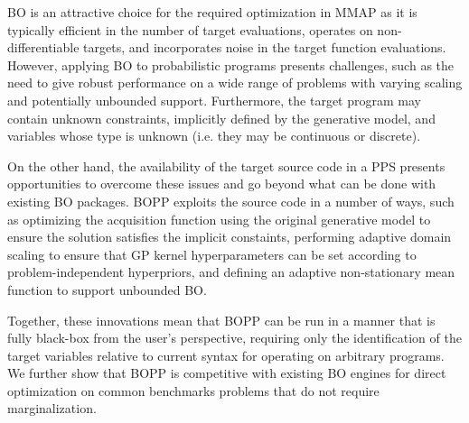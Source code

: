 BO is an attractive choice for the required optimization in MMAP as it is typically efficient in the number of target evaluations, operates on non-differentiable targets, and incorporates noise in the target function evaluations.  However, applying BO to probabilistic programs presents challenges, such as the need to give robust performance on a wide range of problems with varying scaling and potentially unbounded support.  Furthermore, the target program may contain unknown constraints, implicitly defined by the generative model, and variables whose type is unknown (i.e. they may be continuous or discrete).

On the other hand, the availability of the target source code in a PPS presents opportunities to overcome these issues and go beyond what can be done with existing BO packages.  BOPP exploits the source code in a number of ways, such as optimizing the acquisition function using the original generative model to ensure the solution satisfies the implicit constaints, performing adaptive domain scaling to ensure that GP kernel hyperparameters can be set according to problem-independent hyperpriors, and defining an adaptive non-stationary mean function to support unbounded BO. 

Together, these innovations mean that BOPP can be run in a manner that is fully black-box from the user's perspective, requiring only the identification of the target variables relative to current syntax for operating on arbitrary programs. We further show that BOPP is competitive with existing BO engines for direct optimization on common benchmarks problems that do not require marginalization.









